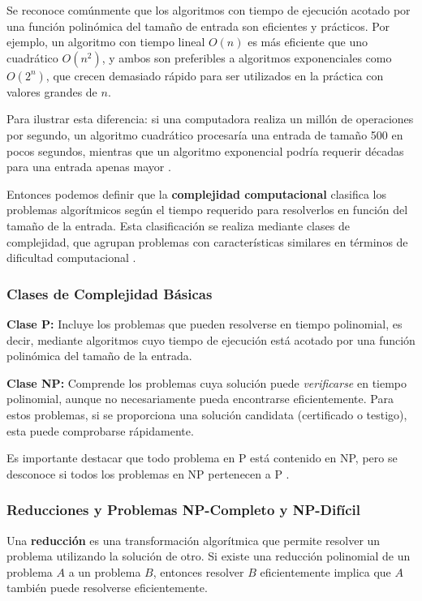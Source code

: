 \documentclass[12pt,titlepage,twoside,openright]{book}
\begin{document}
Se reconoce comúnmente que los algoritmos con tiempo de ejecución acotado por una función polinómica del tamaño de entrada son eficientes y prácticos. Por ejemplo, un algoritmo con tiempo lineal \(O(n)\) es más eficiente que uno cuadrático \(O(n^2)\), y ambos son preferibles a algoritmos exponenciales como \(O(2^n)\), que crecen demasiado rápido para ser utilizados en la práctica con valores grandes de \(n\).

Para ilustrar esta diferencia: si una computadora realiza un millón de operaciones por segundo, un algoritmo cuadrático procesaría una entrada de tamaño 500 en pocos segundos, mientras que un algoritmo exponencial podría requerir décadas para una entrada apenas mayor \citep{palace_postrand2025}.

Entonces podemos definir que la \textbf{complejidad computacional} clasifica los problemas algorítmicos según el tiempo requerido para resolverlos en función del tamaño de la entrada. Esta clasificación se realiza mediante clases de complejidad, que agrupan problemas con características similares en términos de dificultad computacional \citep{madiPvsNP}.

\subsubsection{Clases de Complejidad Básicas}

\textbf{Clase P:} Incluye los problemas que pueden resolverse en tiempo polinomial, es decir, mediante algoritmos cuyo tiempo de ejecución está acotado por una función polinómica del tamaño de la entrada.

\textbf{Clase NP:} Comprende los problemas cuya solución puede \textit{verificarse} en tiempo polinomial, aunque no necesariamente pueda encontrarse eficientemente. Para estos problemas, si se proporciona una solución candidata (certificado o testigo), esta puede comprobarse rápidamente.

Es importante destacar que todo problema en P está contenido en NP, pero se desconoce si todos los problemas en NP pertenecen a P \citep{madiPvsNP}.

\subsubsection{Reducciones y Problemas NP-Completo y NP-Difícil}

Una \textbf{reducción} es una transformación algorítmica que permite resolver un problema utilizando la solución de otro. Si existe una reducción polinomial de un problema \(A\) a un problema \(B\), entonces resolver \(B\) eficientemente implica que \(A\) también puede resolverse eficientemente.
\end{document}
